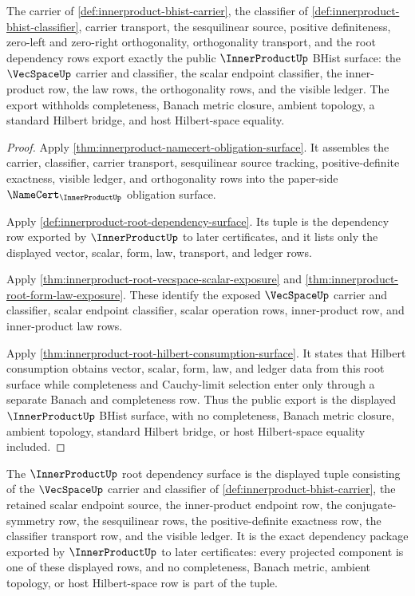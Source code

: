 \begin{theorem}
\label{thm:innerproduct-public-export-surface}
The carrier of \autoref{def:innerproduct-bhist-carrier}, the classifier of
\autoref{def:innerproduct-bhist-classifier}, carrier transport, the
sesquilinear source, positive definiteness, zero-left and zero-right
orthogonality, orthogonality transport, and the root dependency rows export
exactly the public $\InnerProductUp$ BHist surface: the $\VecSpaceUp$ carrier
and classifier, the scalar endpoint classifier, the inner-product row, the law
rows, the orthogonality rows, and the visible ledger. The export withholds
completeness, Banach metric closure, ambient topology, a standard Hilbert
bridge, and host Hilbert-space equality.
\end{theorem}
\begin{proof}
Apply \autoref{thm:innerproduct-namecert-obligation-surface}. It assembles the
carrier, classifier, carrier transport, sesquilinear source tracking,
positive-definite exactness, visible ledger, and orthogonality rows into the
paper-side $\NameCert_{\InnerProductUp}$ obligation surface.

Apply \autoref{def:innerproduct-root-dependency-surface}. Its tuple is the
dependency row exported by $\InnerProductUp$ to later certificates, and it lists
only the displayed vector, scalar, form, law, transport, and ledger rows.

Apply \autoref{thm:innerproduct-root-vecspace-scalar-exposure} and
\autoref{thm:innerproduct-root-form-law-exposure}. These identify the exposed
$\VecSpaceUp$ carrier and classifier, scalar endpoint classifier, scalar
operation rows, inner-product row, and inner-product law rows.

Apply \autoref{thm:innerproduct-root-hilbert-consumption-surface}. It states
that Hilbert consumption obtains vector, scalar, form, law, and ledger data from
this root surface while completeness and Cauchy-limit selection enter only
through a separate Banach and completeness row. Thus the public export is the
displayed $\InnerProductUp$ BHist surface, with no completeness, Banach metric
closure, ambient topology, standard Hilbert bridge, or host Hilbert-space
equality included.
\end{proof}

\begin{definition}
\label{def:innerproduct-root-dependency-surface}
The $\InnerProductUp$ root dependency surface is the displayed tuple consisting
of the $\VecSpaceUp$ carrier and classifier of
\autoref{def:innerproduct-bhist-carrier}, the retained scalar endpoint source,
the inner-product endpoint row, the conjugate-symmetry row, the sesquilinear
rows, the positive-definite exactness row, the classifier transport row, and
the visible ledger. It is the exact dependency package exported by
$\InnerProductUp$ to later certificates: every projected component is one of
these displayed rows, and no completeness, Banach metric, ambient topology, or
host Hilbert-space row is part of the tuple.
\end{definition}

